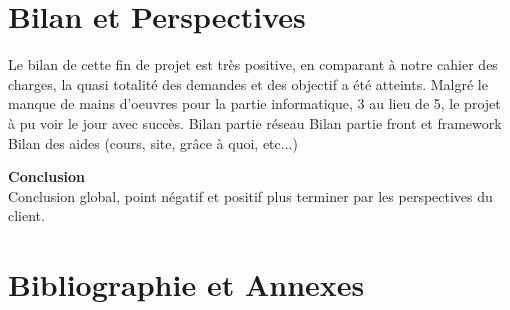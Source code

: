 \documentclass{report}
\begin{document}
\chapter{Bilan et Perspectives} %
Le bilan de cette fin de projet est très positive, en comparant à notre cahier des charges, la quasi totalité des demandes et des objectif a été atteints. Malgré le manque de mains d'oeuvres pour la partie informatique, 3 au lieu de 5, le projet à pu voir le jour avec succès.
Bilan partie réseau
Bilan partie front et framework
Bilan des aides (cours, site, grâce à quoi, etc...)

\vspace{1cm}
\textbf{\huge{}{Conclusion}}\\

Conclusion global, point négatif et positif plus terminer par les perspectives du client.

\chapter{Bibliographie et Annexes}
\end{document}
